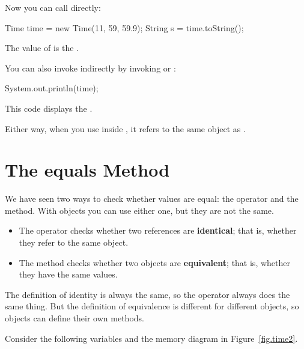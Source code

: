 
Now you can call  directly:

\begin{code}
Time time = new Time(11, 59, 59.9);
String s = time.toString();
\end{code}

The value of  is the  .

You can also invoke  indirectly by invoking  or :

\begin{code}
System.out.println(time);
\end{code}

This code displays the  .

Either way, when you use  inside , it refers to the same object as .


\section{The equals Method}
\label{equals}


We have seen two ways to check whether values are equal: the \java{==} operator and the  method.
With objects you can use either one, but they are not the same.


\begin{itemize}

\item The \java{==} operator checks whether two references are {\bf identical}; that is, whether they refer to the same object.

\item The  method checks whether two objects are {\bf equivalent}; that is, whether they have the same values.

\end{itemize}

The definition of identity is always the same, so the \java{==} operator always does the same thing.
But the definition of equivalence is different for different objects, so objects can define their own  methods.

Consider the following variables and the memory diagram in Figure~\ref{fig.time2}.

